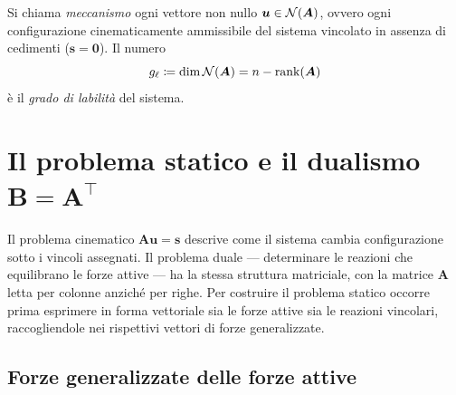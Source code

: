 \begin{definizione}
	\label{def:meccanismo}
	Si chiama \emph{meccanismo} ogni vettore non nullo	$\bm{u} \in \mathcal{N}(\bm{A})$, ovvero ogni configurazione		cinematicamente ammissibile del sistema vincolato in assenza di cedimenti ($\bm{s} = \bm{0}$). Il numero
	\begin{equation}
		g_\ell \coloneqq \dim\mathcal{N}(\bm{A}) = n - \operatorname{rank}(\bm{A})
	\end{equation}
	è il \emph{grado di labilità} del sistema.
\end{definizione}


\section{Il problema statico e il dualismo	\texorpdfstring{$\bm{B} = \bm{A}^{\top}$}{B = A\textasciicircum T}}\label{sec:dualismo}


Il problema cinematico $\bm{A}\bm{u} = \bm{s}$ descrive
come il sistema cambia configurazione sotto i vincoli
assegnati. 	Il problema duale --- determinare le reazioni che
equilibrano le forze attive --- ha la stessa struttura
matriciale, con la matrice $\bm{A}$ letta per colonne
anziché per righe. Per costruire il problema statico
occorre prima esprimere in forma vettoriale sia le
forze attive sia le reazioni vincolari, raccogliendole
nei rispettivi vettori di forze generalizzate.


\subsection{Forze generalizzate delle forze attive}
\label{sec:forze_gen}

